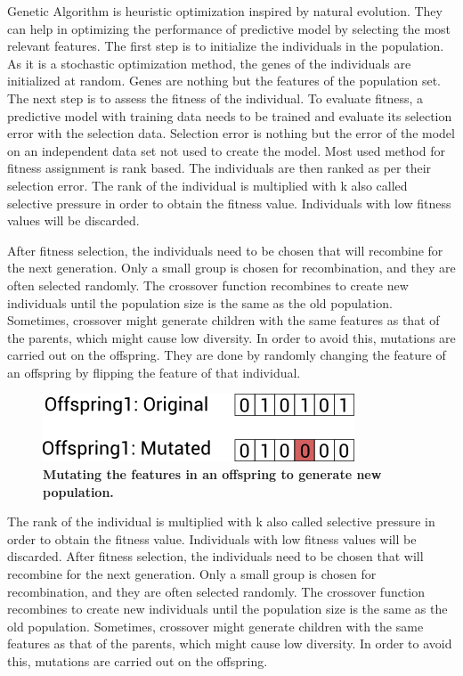 \documentclass[BTech]{srmuthesis}
\begin{document}
Genetic Algorithm is heuristic optimization inspired by natural evolution. They can help in optimizing the performance of predictive model by selecting the most relevant features. The first step is to initialize the individuals in the population. As it is a stochastic optimization method, the genes of the individuals are initialized at random. Genes are nothing but the features of the population set. The next step is to assess the fitness of the individual. To evaluate fitness, a predictive model with training data needs to be trained and evaluate its selection error with the selection data. Selection error is nothing but the error of the model on an independent data set not used to create the model. Most used method for fitness assignment is rank based. The individuals are then ranked as per their selection error. The rank of the individual is multiplied with k also called selective pressure in order to obtain the fitness value. Individuals with low fitness values will be discarded.

After fitness selection, the individuals need to be chosen that will recombine for the next generation. Only a small group is chosen for recombination, and they are often selected randomly. The crossover function recombines to create new individuals until the population size is the same as the old population. Sometimes, crossover might generate children with the same features as that of the parents, which might cause low diversity. In order to avoid this, mutations are carried out on the offspring. They are done by randomly changing the feature of an offspring by flipping the feature of that individual.

\begin{figure}[H]
	\centering
	\includegraphics[width=0.4\linewidth]{4.png}
	\caption{\bf Mutating the features in an offspring to generate new population.}
	\label{fig:GA_Offspring}
\end{figure}

The rank of the individual is multiplied with k also called selective pressure in order to obtain the fitness value. Individuals with low fitness values will be discarded. After fitness selection, the individuals need to be chosen that will recombine for the next generation. Only a small group is chosen for recombination, and they are often selected randomly. The crossover function recombines to create new individuals until the population size is the same as the old population. Sometimes, crossover might generate children with the same features as that of the parents, which might cause low diversity. In order to avoid this, mutations are carried out on the offspring.
\end{document}
